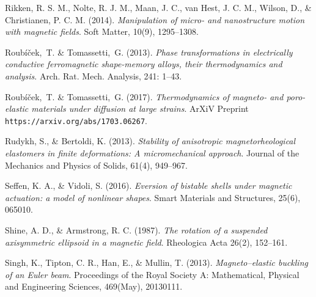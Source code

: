 \documentclass[oneside]{article}
\begin{document}
\begin{thebibliography}{9}
				 Rikken, R. S. M., Nolte, R. J. M., Maan, J. C., van Hest, J. C. M., Wilson, D., \& Christianen, P. C. M. (2014). \textit{Manipulation of micro- and nanostructure motion with magnetic fields}. Soft Matter, 10(9), 1295--1308. 
				
				
				 Roub\'i\v{c}ek,~T. \& Tomassetti,~G. (2013). \textit{Phase transformations in electrically conductive ferromagnetic shape-memory alloys, their thermodynamics and analysis}. Arch. Rat. Mech. Analysis, 241: 1--43.
				
				 Roub\'i\v{c}ek,~T. \& Tomassetti,~G. (2017). \textit{Thermodynamics of magneto- and poro-elastic materials under diffusion at large strains}. ArXiV Preprint \texttt{https://arxiv.org/abs/1703.06267}.
				
				 Rudykh, S., \& Bertoldi, K. (2013). \textit{Stability of anisotropic magnetorheological elastomers in finite deformations: A micromechanical approach}. Journal of the Mechanics and Physics of Solids, 61(4), 949--967. 
				
				
				 Seffen, K. A., \& Vidoli, S. (2016). \textit{Eversion of bistable shells under magnetic actuation: a model of nonlinear shapes}. Smart Materials and Structures, 25(6), 065010. 
				
				 Shine, A. D., \& Armstrong, R. C. (1987). 
				\textit{The rotation of a suspended axisymmetric ellipsoid in a magnetic field}. Rheologica Acta
				26(2), 152--161.
				
				 Singh, K., Tipton, C. R., Han, E., \& Mullin, T. (2013). \textit{Magneto--elastic buckling of an Euler beam}. Proceedings of the Royal Society A: Mathematical, Physical and Engineering Sciences, 469(May), 20130111. 
				
				

\end{thebibliography}
\end{document}
